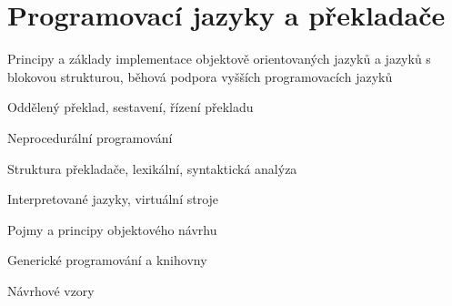 \section{Programovací jazyky a překladače}
\begin{pozadavky}
\begin{pitemize}
\item Principy a základy implementace objektově orientovaných jazyků a jazyků s blokovou strukturou, běhová podpora vyšších programovacích jazyků
\item Oddělený překlad, sestavení, řízení překladu
\item Neprocedurální programování
\item Struktura překladače, lexikální, syntaktická analýza
\item Interpretované jazyky, virtuální stroje
\item Pojmy a principy objektového návrhu
\item Generické programování a knihovny
\item Návrhové vzory
\end{pitemize}
\end{pozadavky}









